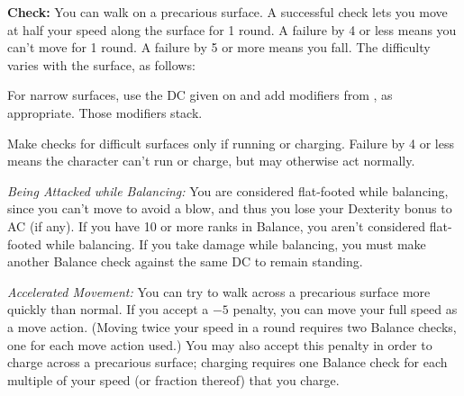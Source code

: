 \textbf{Check:} You can walk on a precarious surface. A successful check lets you move at half your speed along the surface for 1 round. A failure by 4 or less means you can't move for 1 round. A failure by 5 or more means you fall. The difficulty varies with the surface, as follows:



For narrow surfaces, use the DC given on  and add modifiers from , as appropriate. Those modifiers stack.

Make checks for difficult surfaces only if running or charging. Failure by 4 or less means the character can't run or charge, but may otherwise act normally.

\textit{Being Attacked while Balancing:} You are considered flat-footed while balancing, since you can't move to avoid a blow, and thus you lose your Dexterity bonus to AC (if any). If you have 10 or more ranks in Balance, you aren't considered flat-footed while balancing. If you take damage while balancing, you must make another Balance check against the same DC to remain standing.

\textit{Accelerated Movement:} You can try to walk across a precarious surface more quickly than normal. If you accept a $-5$ penalty, you can move your full speed as a move action. (Moving twice your speed in a round requires two Balance checks, one for each move action used.) You may also accept this penalty in order to charge across a precarious surface; charging requires one Balance check for each multiple of your speed (or fraction thereof) that you charge.


